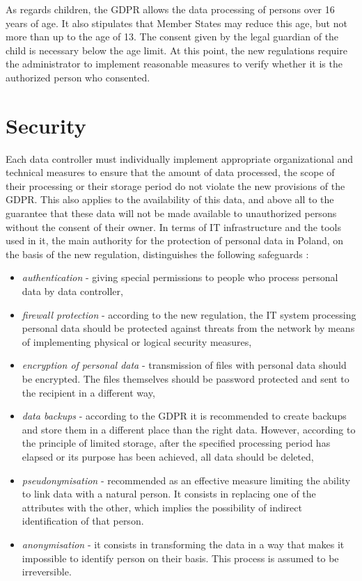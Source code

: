 \documentclass[en, noamssymb]{mgr}
\begin{document}
\indent As regards children, the GDPR allows the data processing of persons over 16 years of age. It also stipulates that Member States may reduce this age, but not more than up to the age of 13. The consent given by the legal guardian of the child is necessary below the age limit. At this point, the new regulations require the administrator to implement reasonable measures to verify whether it is the authorized person who consented.

\section{Security}

Each data controller must individually implement appropriate organizational and technical measures to ensure that the amount of data processed, the scope of their processing or their storage period do not violate the new provisions of the GDPR. This also applies to the availability of this data, and above all to the guarantee that these data will not be made available to unauthorized persons without the consent of their owner. In terms of IT infrastructure and the tools used in it, the main authority for the protection of personal data in Poland, on the basis of the new regulation, distinguishes the following safeguards \cite{lexdigital_srodki}:

\begin{itemize}

\item \textit{authentication} - giving special permissions to people who process personal data by data controller,

\item \textit{firewall protection} - according to the new regulation, the IT system processing personal data should be protected against threats from the network by means of implementing physical or logical security measures,

\item \textit{encryption of personal data} - transmission of files with personal data should be encrypted. The files themselves should be password protected and sent to the recipient in a different way,

\item \textit{data backups} - according to the GDPR it is recommended to create backups and store them in a different place than the right data. However, according to the principle of limited storage, after the specified processing period has elapsed or its purpose has been achieved, all data should be deleted,

\item \textit{pseudonymisation} - recommended as an effective measure limiting the ability to link data with a natural person. It consists in replacing one of the attributes with the other, which implies the possibility of indirect identification of that person.

\item \textit{anonymisation} - it consists in transforming the data in a way that makes it impossible to identify person on their basis. This process is assumed to be irreversible.

\end{itemize}
\end{document}

